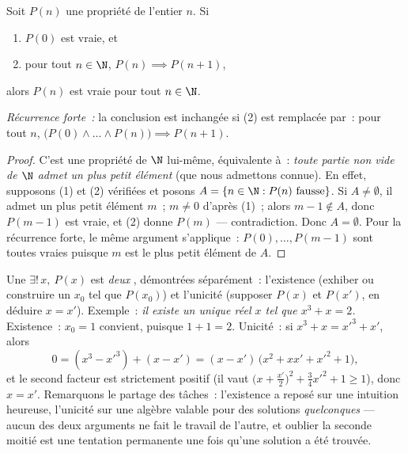 \begin{theorem}[Récurrence]\label{thm:b1:logic:induction}
Soit $P(n)$ une propriété de l'entier $n$. Si
\begin{enumerate}
  \item $P(0)$ est vraie, et
  \item pour tout $n \in \N$, $P(n) \implies P(n+1)$,
\end{enumerate}
alors $P(n)$ est vraie pour tout $n \in \N$.

\emph{Récurrence forte~:} la conclusion est inchangée si (2) est
remplacée par~: pour tout $n$, $\bigl(P(0) \land \dots \land
P(n)\bigr) \implies P(n+1)$.
\end{theorem}

\begin{proof}
C'est une propriété de $\N$ lui-même, équivalente à~: \emph{toute partie
non vide de $\N$ admet un plus petit élément} (que nous admettons
connue). En effet, supposons (1) et (2) vérifiées et posons
$A = \{n \in \N : P(n) \text{ fausse}\}$. Si $A \neq \emptyset$, il
admet un plus petit élément $m$~; $m \neq 0$ d'après (1)~; alors
$m - 1 \notin A$, donc $P(m-1)$ est vraie, et (2) donne $P(m)$ ---
contradiction. Donc $A = \emptyset$. Pour la récurrence forte, le même
argument s'applique~: $P(0), \dots, P(m-1)$ sont toutes vraies puisque
$m$ est le plus petit élément de $A$.
\end{proof}

\begin{example}\label{ex:b1:logic:uniqueexistence}
Une  $\exists!\,x,\ P(x)$ est \emph{deux} ,
démontrées séparément~: l'existence (exhiber ou construire un $x_0$
tel que $P(x_0)$) et l'unicité (supposer $P(x)$ et $P(x')$, en
déduire $x = x'$). Exemple~: \emph{il existe un unique réel $x$ tel
que $x^3 + x = 2$.} Existence~: $x_0 = 1$ convient, puisque
$1 + 1 = 2$. Unicité~: si $x^3 + x = x'^3 + x'$, alors
\[
0 = (x^3 - x'^3) + (x - x')
= (x - x')\,\bigl(x^2 + xx' + x'^2 + 1\bigr),
\]
et le second facteur est strictement positif (il vaut $\bigl(x +
\tfrac{x'}2\bigr)^2 + \tfrac34 x'^2 + 1 \geq 1$), donc $x = x'$.
Remarquons le partage des tâches~: l'existence a reposé sur une
intuition heureuse, l'unicité sur une algèbre valable pour des
solutions \emph{quelconques} --- aucun des deux arguments ne fait le
travail de l'autre, et oublier la seconde moitié est une tentation
permanente une fois qu'une solution a été trouvée.
\end{example}

